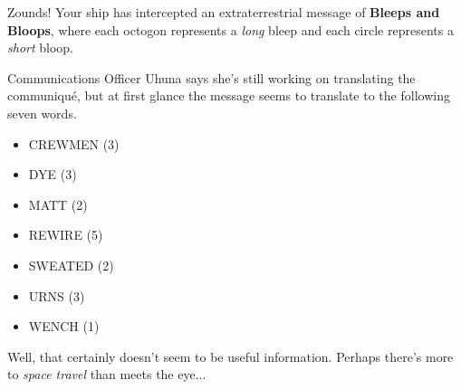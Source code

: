 Zounds! Your ship has intercepted an extraterrestrial message of
\textbf{Bleeps and Bloops}, where each octogon
represents a \textit{long} bleep and each circle represents
a \textit{short} bloop.

Communications Officer Uhuna says she's still working
on translating the communiqu\'e, but at first glance the message
seems to translate to the following seven words.

\begin{itemize}
\item CREWMEN (3)
\item DYE (3)
\item MATT (2)
\item REWIRE (5)
\item SWEATED (2)
\item URNS (3)
\item WENCH (1)
\end{itemize}

Well, that certainly doesn't seem to be useful information.
Perhaps there's more to \textit{space travel} than meets the eye... 
